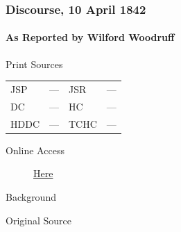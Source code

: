 		\subsubsection{Discourse, 10 April 1842}
			\label{EMS-1842-JS-10-APR-1842}
			
			\paragraph{As Reported by Wilford Woodruff}
				\label{EMS-1842-JS-10-APR-1842-WW}
			
				\begin{description}
					\item[Print Sources]
				\end{description}

				\begin{tabular}{p{0.5in}p{1in}p{0.5in}p{1in}}
					JSP	 	& ---		& JSR 		& --- \\
					DC	 	& ---		& HC 		& --- \\
					HDDC 	& ---		& TCHC 		& --- \\
				\end{tabular}
				
				\begin{description}
					\item[Online Access] \href{https://www.josephsmithpapers.org/paper-summary/discourse-10-april-1842-as-reported-by-wilford-woodruff/1}{Here}
				\end{description}
				
				\begin{description}
					\item[Background]
				\end{description}
				
				
				\begin{description}
					\item[Original Source]
				\end{description}
				
